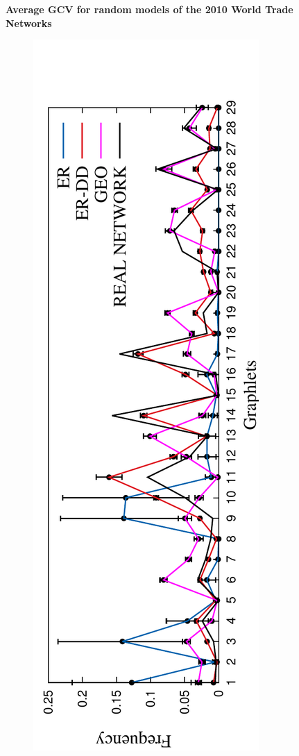 \begin{figure}[H]
  \centering
  \textbf{Average GCV for random models of the 2010 World Trade Networks}
  \begin{subfigure}[b]{1.0\textwidth}
    \includegraphics[angle=-90,scale=0.6]{../code/final_results/trade_2010_thresholded/avg_egdvs_rnd_spreads_figures/spreads_012_rnd2.pdf} 

\end{subfigure}
\end{figure}
